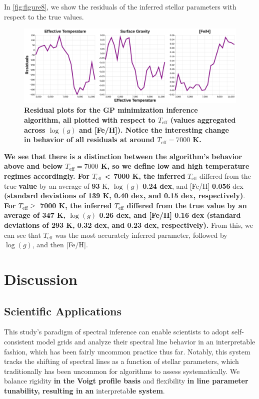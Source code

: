 \documentclass[twocolumn, linenumbers]{aastex631}
\begin{document}
In \autoref{fig:figure8}, we show the residuals of the inferred stellar parameters with respect to the true values.
\begin{figure}
    \centering
    \includegraphics[width=\textwidth]{figure8}
    \caption{\textbf{Residual plots for the GP minimization inference algorithm, all plotted with respect to $T_\text{eff}$ (values aggregated across $\log(g)$ and [Fe/H]).
    Notice the interesting change in behavior of all residuals at around $T_\text{eff} = 7000$ K.}}
    \label{fig:figure8}
\end{figure}
\textbf{We see that there is a distinction between the algorithm's behavior above and below $T_{\mathrm{eff}} = 7000$ K, so we define low and high temperature regimes accordingly.
For $T_{\mathrm{eff}}$ < 7000 K, the inferred} $T_{\mathrm{eff}}$ differed from the true \textbf{value} by an average of \textbf{93} K, $\log(g)$ \textbf{0.24 dex}, and [Fe/H] \textbf{0.056} dex \textbf{(standard deviations of 139 K, 0.40 dex, and 0.15 dex, respectively)}.
\textbf{For $T_{\mathrm{eff}} \ge$ 7000 K, the inferred $T_{\mathrm{eff}}$ differed from the true value by an average of 347 K, $\log(g)$ 0.26 dex, and [Fe/H] 0.16 dex (standard deviations of 293 K, 0.32 dex, and 0.23 dex, respectively).}
From this, we can see that $T_{\mathrm{eff}}$ was the most accurately inferred parameter, followed by $\log(g)$, and then [Fe/H].

\section{Discussion}
\subsection{Scientific Applications}
This study's paradigm of spectral inference can enable scientists to adopt self-consistent model grids and analyze their spectral line behavior in an interpretable fashion, which has been fairly uncommon practice thus far.
Notably, this system tracks the shifting of spectral lines as a function of stellar parameters, which traditionally has been uncommon for algorithms to assess systematically.
We balance rigidity \textbf{in the Voigt profile basis} and flexibility \textbf{in line parameter tunability, resulting in an} interpretab\textbf{le system}.
\end{document}
